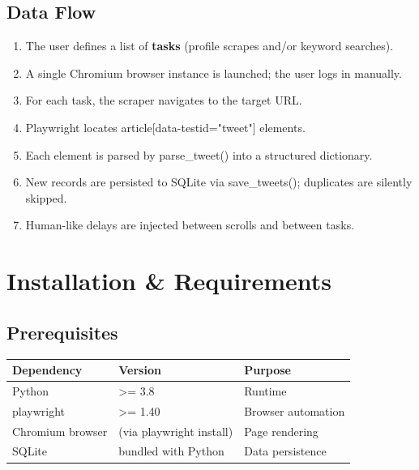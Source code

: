 \documentclass[11pt, a4paper]{article}
\def\method#1{#1}%
\def\texttt#1{#1}%
\def\color#1{}%
\newcommand{\method}[1]{\texttt{\color{TwBlue}#1}}
\begin{document}
\subsection{Data Flow}

\begin{enumerate}[leftmargin=1.8em, itemsep=4pt]
  \item The user defines a list of \textbf{tasks} (profile scrapes and/or keyword searches).
  \item A single Chromium browser instance is launched; the user logs in manually.
  \item For each task, the scraper navigates to the target URL.
  \item Playwright locates \texttt{article[data-testid="tweet"]} elements.
  \item Each element is parsed by \method{parse\_tweet()} into a structured dictionary.
  \item New records are persisted to SQLite via \method{save\_tweets()}; duplicates are silently skipped.
  \item Human-like delays are injected between scrolls and between tasks.
\end{enumerate}

\section{Installation \& Requirements}

\subsection{Prerequisites}

\begin{center}
\begin{tabular}{lll}
\toprule
\textbf{Dependency} & \textbf{Version} & \textbf{Purpose} \\
\midrule
\rowcolor{TwLight} Python  & >= 3.8  & Runtime \\
playwright                 & >= 1.40 & Browser automation \\
\rowcolor{TwLight} Chromium browser & (via playwright install) & Page rendering \\
SQLite                     & bundled with Python & Data persistence \\
\bottomrule
\end{tabular}
\end{center}
\end{document}
